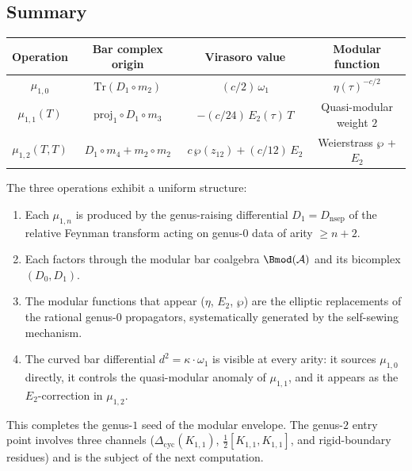 \documentclass[11pt]{article}
\newcommand{\cA}{\mathcal{A}}
\begin{document}
\subsection{Summary}

\begin{center}
\renewcommand{\arraystretch}{1.5}
\begin{tabular}{@{}cccc@{}}
\toprule
Operation & Bar complex origin & Virasoro value & Modular function \\
\midrule
$\mu_{1,0}$ & $\mathrm{Tr}(D_1 \circ m_2)$
  & $(c/2)\,\omega_1$
  & $\eta(\tau)^{-c/2}$ \\
$\mu_{1,1}(T)$ & $\mathrm{proj}_1 \circ D_1 \circ m_3$
  & $-(c/24)\,E_2(\tau)\,T$
  & Quasi-modular weight $2$ \\
$\mu_{1,2}(T,T)$ & $D_1 \circ m_4 + m_2 \circ m_2$
  & $c\,\wp(z_{12}) + (c/12)\,E_2$
  & Weierstrass $\wp$ + $E_2$ \\
\bottomrule
\end{tabular}
\end{center}

The three operations exhibit a uniform structure:
\begin{enumerate}[label=\textup{(\roman*)}]
\item Each $\mu_{1,n}$ is produced by the genus-raising differential
  $D_1 = D_{\mathrm{nsep}}$ of the relative Feynman transform
  acting on genus-$0$ data of arity $\geq n+2$.
\item Each factors through the modular bar coalgebra $\Bmod(\cA)$
  and its bicomplex $(D_0, D_1)$.
\item The modular functions that appear ($\eta$, $E_2$, $\wp$) are
  the elliptic replacements of the rational genus-$0$ propagators,
  systematically generated by the self-sewing mechanism.
\item The curved bar differential $d^2 = \kappa \cdot \omega_1$ is
  visible at every arity: it sources $\mu_{1,0}$ directly, it
  controls the quasi-modular anomaly of $\mu_{1,1}$, and it appears
  as the $E_2$-correction in $\mu_{1,2}$.
\end{enumerate}

This completes the genus-$1$ seed of the modular envelope.  The
genus-$2$ entry point involves three channels
($\Delta_{\mathrm{cyc}}(K_{1,1})$, $\frac{1}{2}[K_{1,1},K_{1,1}]$,
and rigid-boundary residues) and is the subject of the next computation.


\end{document}

